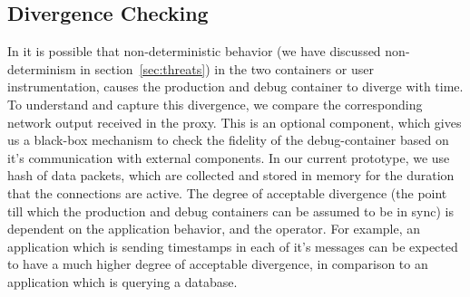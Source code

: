 
\subsection{Divergence Checking}
\label{sec:divergenceChecking}

In \parikshan it is possible that non-deterministic behavior (we have discussed non-determinism in section~\ref{sec:threats}) in the two containers or user instrumentation, causes the production and debug container to diverge with time.
To understand and capture this divergence, we compare the corresponding network output received in the proxy.
This is an optional component, which gives us a black-box mechanism to check the fidelity of the debug-container based on it's communication with external components.
In our current prototype, we use hash of data packets, which are collected and stored in memory for the duration that the connections are active.
The degree of acceptable divergence (the point till which the production and debug containers can be assumed to be in sync) is dependent on the application behavior, and the operator. 
For example, an application which is sending timestamps in each of it's messages can be expected to have a much higher degree of acceptable divergence, in comparison to an application which is querying a database.